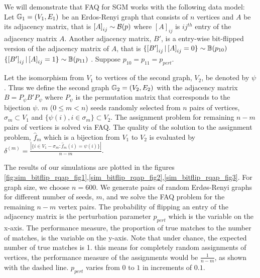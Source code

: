 \documentclass[12pt,oneside,final]{thesis}
\begin{document}
We will demonstrate that  FAQ for SGM works with the following data model:
Let $\mathbb{G}_1=(V_1,E_1)$ be an Erdos-Renyi graph that consists of $n$ vertices and $A$ be its adjacency matrix,  that is
  $\left[A\right]_{ij} \sim \mathcal{B}(p)$ where $\left[A\right]_{ij}$ is ${ij}^{th}$ entry of the adjacency matrix  $A$. Another adjacency matrix, $B'$, is a entry-wise bit-flipped version of the adjacency matrix of $A$, that is
    $\{\left[B' \right]_{ij}|\left[A\right]_{ij}=0 \} \sim \mathbb{B}(p_{10})$ $\{\left[B'\right]_{ij}|\left[A\right]_{ij}=1 \} \sim \mathbb{B}(p_{11})$  . Suppose $p_{10}=p_{11}=p_{pert}$.
    
    Let the isomorphism from  $V_1$ to vertices of the second graph, $V_2$, be denoted by $\psi$. Thus we define the second graph $\mathbb{G}_2=(V_2,E_2)$ with the adjacency matrix $B=P_{\psi}B'P_{\psi}$ where $P_{\psi}$ is the permutation matrix that corresponds to the bijection $\psi$. $m$ ($0\leq m<n$) seeds randomly selected from $n$ pairs of vertices, $\sigma_m \subset V_1$  and  $\{\psi(i), i \in \sigma_m \}\subset V_2 $. The assignment problem for remaining $n-m$ pairs of vertices is solved via FAQ. The quality of the solution to the assignment problem, $\hat{f}_m$ which is a bijection from  $V_1$ to  $V_2$ is evaluated  by  $\delta^{(m)} = \frac{|\{i\in V_1-\sigma_m: \hat{f}_m(i)=\psi(i)\}|}{n-m}$.
  
  The results of our simulations are plotted in the figures \ref{fig:sim_bitflip_rqap_fig1},\ref{sim_bitflip_rqap_fig2},\ref{sim_bitflip_rqap_fig3}. For graph size, we choose $n=600$. We generate pairs of random Erd\o s-Renyi graphs  for different number of seeds, $m$, and  we solve the FAQ problem for the remaining $n-m$ vertex pairs. The probability of flipping an entry of the adjacency matrix is the perturbation parameter $p_{pert}$ which is the variable on the x-axis. The performance measure, the proportion of true matches to the number of matches, is the variable on the y-axis.
  Note that 
  under chance, the expected number of true matches is 1. this means for completely random assignments of vertices, the performance measure of the assignments would be $\frac{1}{n-m}$, as shown with the dashed line.  $p_{pert}$ varies from $0$ to $1$ in increments of $0.1$. 
\end{document}
